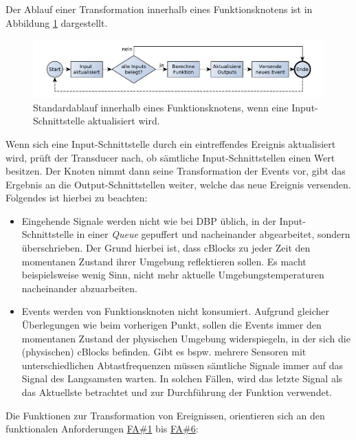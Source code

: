  Der Ablauf einer Transformation innerhalb eines Funktionsknotens ist in Abbildung \ref{fig:seqfunktionsblock} dargestellt.
 \begin{figure}[h]
  \centering
  \includegraphics[width=1\textwidth]{bilder/chapter4/chapter4_2/funktionsblockablauf.pdf}
  \caption{Standardablauf innerhalb eines Funktionsknotens, wenn eine Input-Schnittstelle aktualisiert wird.}
  \label{fig:seqfunktionsblock}
\end{figure}
Wenn sich eine Input-Schnittstelle durch ein eintreffendes Ereignis aktualisiert wird, prüft der Transducer nach, ob sämtliche Input-Schnittstellen einen Wert besitzen. Der Knoten nimmt dann seine Transformation der Events vor, gibt das Ergebnis an die Output-Schnittstellen weiter, welche das neue Ereignis versenden. Folgendes ist hierbei zu beachten: 
\begin{itemize}
    \item Eingehende Signale werden nicht wie bei \ac{DBP} üblich, in der Input-Schnittstelle in einer \textit{Queue} gepuffert und nacheinander abgearbeitet, sondern überschrieben. Der Grund hierbei ist, dass cBlocks zu jeder Zeit den momentanen Zustand ihrer Umgebung reflektieren sollen. Es macht beispielsweise wenig Sinn, nicht mehr aktuelle Umgebungstemperaturen nacheinander abzuarbeiten.
    \item Events werden von Funktionsknoten nicht konsumiert. Aufgrund gleicher Überlegungen wie beim vorherigen Punkt, sollen die Events immer den momentanen Zustand der physischen Umgebung widerspiegeln, in der sich die (physischen) cBlocks befinden. Gibt es bspw. mehrere Sensoren mit unterschiedlichen Abtastfrequenzen müssen sämtliche Signale immer auf das Signal des Langsamsten warten. In solchen Fällen, wird das letzte Signal als das Aktuellste betrachtet und zur Durchführung der Funktion verwendet.
\end{itemize}
 Die Funktionen zur Transformation von Ereignissen, orientieren sich an den funktionalen Anforderungen \hyperref[tab:fanf]{FA\#1}  bis  \hyperref[tab:fanf]{FA\#6}:
